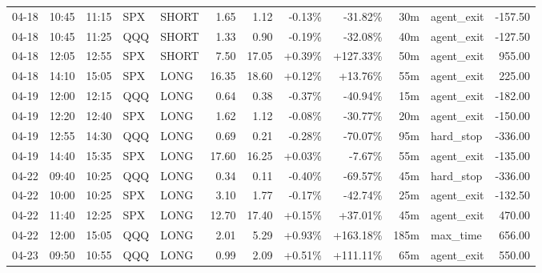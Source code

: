 \documentclass[11pt,a4paper,twoside]{article}
\begin{document}
\begin{center}
\begin{longtable}{>{\color{txtmain}}l l l l l r r r r r >{\color{txtmain}}l r}
04-18 & 10:45 & 11:15 & SPX & SHORT & 1.65 & 1.12 & \textcolor{lossred}{-0.13\%} & \textcolor{lossred}{-31.82\%} & 30m & agent\_exit & \textcolor{lossred}{-157.50} \\
04-18 & 10:45 & 11:25 & QQQ & SHORT & 1.33 & 0.90 & \textcolor{lossred}{-0.19\%} & \textcolor{lossred}{-32.08\%} & 40m & agent\_exit & \textcolor{lossred}{-127.50} \\
04-18 & 12:05 & 12:55 & SPX & SHORT & 7.50 & 17.05 & \textcolor{wingreen}{+0.39\%} & \textcolor{wingreen}{+127.33\%} & 50m & agent\_exit & \textcolor{wingreen}{955.00} \\
04-18 & 14:10 & 15:05 & SPX & LONG & 16.35 & 18.60 & \textcolor{wingreen}{+0.12\%} & \textcolor{wingreen}{+13.76\%} & 55m & agent\_exit & \textcolor{wingreen}{225.00} \\
04-19 & 12:00 & 12:15 & QQQ & LONG & 0.64 & 0.38 & \textcolor{lossred}{-0.37\%} & \textcolor{lossred}{-40.94\%} & 15m & agent\_exit & \textcolor{lossred}{-182.00} \\
04-19 & 12:20 & 12:40 & SPX & LONG & 1.62 & 1.12 & \textcolor{lossred}{-0.08\%} & \textcolor{lossred}{-30.77\%} & 20m & agent\_exit & \textcolor{lossred}{-150.00} \\
04-19 & 12:55 & 14:30 & QQQ & LONG & 0.69 & 0.21 & \textcolor{lossred}{-0.28\%} & \textcolor{lossred}{-70.07\%} & 95m & hard\_stop & \textcolor{lossred}{-336.00} \\
04-19 & 14:40 & 15:35 & SPX & LONG & 17.60 & 16.25 & \textcolor{wingreen}{+0.03\%} & \textcolor{lossred}{-7.67\%} & 55m & agent\_exit & \textcolor{lossred}{-135.00} \\
04-22 & 09:40 & 10:25 & QQQ & LONG & 0.34 & 0.11 & \textcolor{lossred}{-0.40\%} & \textcolor{lossred}{-69.57\%} & 45m & hard\_stop & \textcolor{lossred}{-336.00} \\
04-22 & 10:00 & 10:25 & SPX & LONG & 3.10 & 1.77 & \textcolor{lossred}{-0.17\%} & \textcolor{lossred}{-42.74\%} & 25m & agent\_exit & \textcolor{lossred}{-132.50} \\
04-22 & 11:40 & 12:25 & SPX & LONG & 12.70 & 17.40 & \textcolor{wingreen}{+0.15\%} & \textcolor{wingreen}{+37.01\%} & 45m & agent\_exit & \textcolor{wingreen}{470.00} \\
04-22 & 12:00 & 15:05 & QQQ & LONG & 2.01 & 5.29 & \textcolor{wingreen}{+0.93\%} & \textcolor{wingreen}{+163.18\%} & 185m & max\_time & \textcolor{wingreen}{656.00} \\
04-23 & 09:50 & 10:55 & QQQ & LONG & 0.99 & 2.09 & \textcolor{wingreen}{+0.51\%} & \textcolor{wingreen}{+111.11\%} & 65m & agent\_exit & \textcolor{wingreen}{550.00} \\

\end{longtable}
\end{center}
\end{document}
